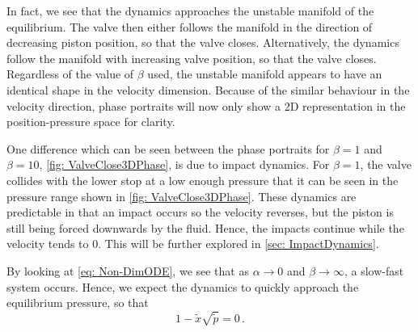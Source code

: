 In fact, we see that the dynamics approaches the unstable manifold of the equilibrium. The valve then either follows the manifold in the direction of decreasing piston position, so that the valve closes. Alternatively, the dynamics follow the manifold with increasing valve position, so that the valve closes. Regardless of the value of $\beta$ used, the unstable manifold appears to have an identical shape in the velocity dimension. Because of the similar behaviour in the velocity direction, phase portraits will now only show a 2D representation in the position-pressure space for clarity.

One difference which can be seen between the phase portraits for $\beta = 1$ and $\beta = 10$, \cref{fig: ValveClose3DPhase}, is due to impact dynamics. For $\beta = 1$, the valve collides with the lower stop at a low enough pressure that it can be seen in the pressure range shown in \cref{fig: ValveClose3DPhase}. These dynamics are predictable in that an impact occurs so the velocity reverses, but the piston is still being forced downwards by the fluid. Hence, the impacts continue while the velocity tends to 0. This will be further explored in \cref{sec: ImpactDynamics}.

By looking at \cref{eq: Non-DimODE}, we see that as $\alpha \rightarrow 0$ and $\beta \rightarrow \infty$, a slow-fast system occurs. Hence, we expect the dynamics to quickly approach the equilibrium pressure, so that
~
\begin{equation*}
    1 - \tilde{x} \sqrt{\tilde{p}} = 0 \, .
\end{equation*}

